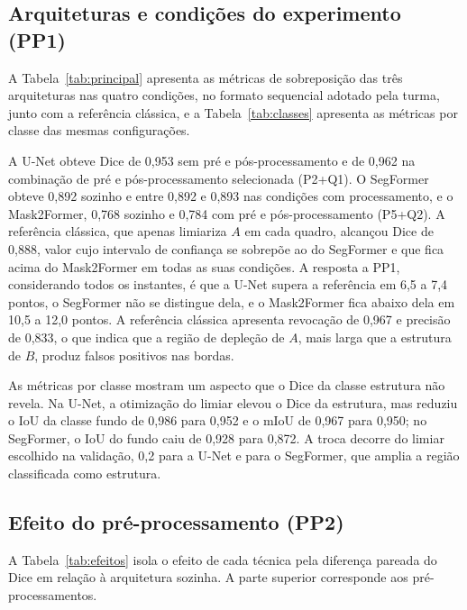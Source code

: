 \documentclass[12pt]{article}
\begin{document}
\subsection{Arquiteturas e condições do experimento (PP1)}
\label{subsec:pp1}

A Tabela~\ref{tab:principal} apresenta as métricas de sobreposição das três arquiteturas nas quatro condições, no formato sequencial adotado pela turma, junto com a referência clássica, e a Tabela~\ref{tab:classes} apresenta as métricas por classe das mesmas configurações.



A U-Net obteve Dice de 0,953 sem pré e pós-processamento e de 0,962 na combinação de pré e pós-processamento selecionada (P2+Q1). O SegFormer obteve 0,892 sozinho e entre 0,892 e 0,893 nas condições com processamento, e o Mask2Former, 0,768 sozinho e 0,784 com pré e pós-processamento (P5+Q2). A referência clássica, que apenas limiariza $A$ em cada quadro, alcançou Dice de 0,888, valor cujo intervalo de confiança se sobrepõe ao do SegFormer e que fica acima do Mask2Former em todas as suas condições. A resposta a PP1, considerando todos os instantes, é que a U-Net supera a referência em 6,5 a 7,4 pontos, o SegFormer não se distingue dela, e o Mask2Former fica abaixo dela em 10,5 a 12,0 pontos. A referência clássica apresenta revocação de 0,967 e precisão de 0,833, o que indica que a região de depleção de $A$, mais larga que a estrutura de $B$, produz falsos positivos nas bordas.



As métricas por classe mostram um aspecto que o Dice da classe estrutura não revela. Na U-Net, a otimização do limiar elevou o Dice da estrutura, mas reduziu o IoU da classe fundo de 0,986 para 0,952 e o mIoU de 0,967 para 0,950; no SegFormer, o IoU do fundo caiu de 0,928 para 0,872. A troca decorre do limiar escolhido na validação, 0,2 para a U-Net e para o SegFormer, que amplia a região classificada como estrutura.

\subsection{Efeito do pré-processamento (PP2)}
\label{subsec:pp2}

A Tabela~\ref{tab:efeitos} isola o efeito de cada técnica pela diferença pareada do Dice em relação à arquitetura sozinha. A parte superior corresponde aos pré-processamentos.
\end{document}
